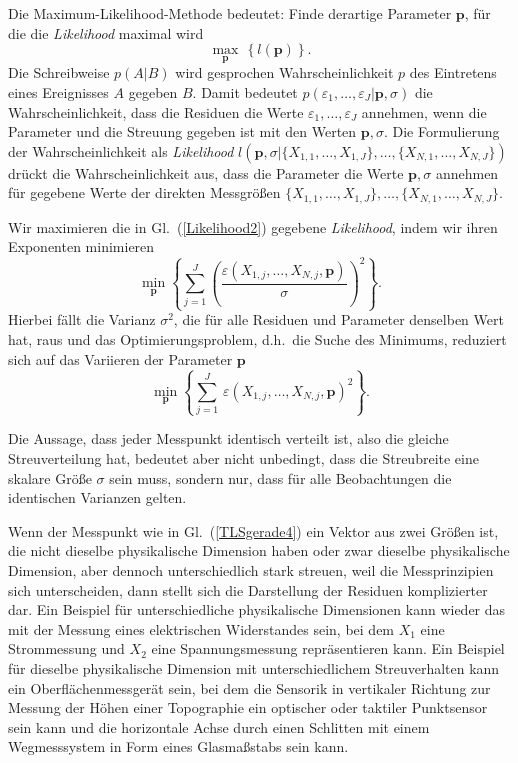 Die Maximum-Likelihood-Methode bedeutet: Finde derartige Parameter $\mathbf{p}$, für die
die \textsl{Likelihood} maximal wird
\begin{equation}
\max_{\mathbf{p}} \, \left\{ l(\mathbf{p}) \right\}.
\end{equation}
Die Schreibweise $p(A | B)$ wird gesprochen \glqq Wahrscheinlichkeit $p$ des Eintretens eines Ereignisses
$A$ gegeben $B$\grqq. Damit bedeutet $p(\varepsilon_1,\dots,\varepsilon_J | \mathbf{p}, \sigma)$ die Wahrscheinlichkeit,
dass die Residuen die Werte $\varepsilon_1,\dots,\varepsilon_J$ annehmen, wenn die Parameter und die Streuung gegeben ist
mit den Werten $\mathbf{p}, \sigma$. Die Formulierung der Wahrscheinlichkeit als \textsl{Likelihood}
$l(\mathbf{p}, \sigma | \{X_{1,1}, \dots, X_{1,J}\}, \dots, \{X_{N,1}, \dots, X_{N,J}\})$ drückt die
Wahrscheinlichkeit aus, dass die Parameter die Werte $\mathbf{p}, \sigma$ annehmen für gegebene Werte der
direkten Messgrößen $\{X_{1,1}, \dots, X_{1,J}\}, \dots, \{X_{N,1}, \dots, X_{N,J}\}$.

Wir maximieren die in Gl.~(\ref{Likelihood2}) gegebene \textsl{Likelihood}, indem wir
ihren Exponenten minimieren
\begin{equation}
\min_{\mathbf{p}}\left\{ \sum\limits_{j = 1}^J \left(\frac{\varepsilon(X_{1,j},\dots,X_{N,j},\mathbf{p})}{\sigma}\right)^2  \right\}.
\end{equation}
Hierbei fällt die Varianz $\sigma^2$, die für alle Residuen und Parameter denselben Wert hat, raus und
das Optimierungsproblem, d.h.\ die Suche des Minimums, reduziert sich
auf das Variieren der Parameter $\mathbf{p}$
\begin{equation}
\min_{\mathbf{p}} \left\{ \sum\limits_{j = 1}^J \, \varepsilon(X_{1,j},\dots,X_{N,j},\mathbf{p})^2  \right\} .
\end{equation}

Die Aussage, dass jeder Messpunkt identisch verteilt ist, also die gleiche Streuverteilung hat,
bedeutet aber nicht unbedingt, dass die Streubreite eine skalare Größe $\sigma$ sein muss,
sondern nur, dass für alle Beobachtungen die identischen Varianzen gelten.

Wenn der Messpunkt wie in Gl.~(\ref{TLSgerade4}) ein Vektor aus zwei Größen ist, die nicht
dieselbe physikalische Dimension haben oder zwar dieselbe physikalische Dimension, aber dennoch
unterschiedlich stark streuen, weil die Messprinzipien sich unterscheiden, dann stellt sich
die Darstellung der Residuen komplizierter dar. Ein Beispiel für unterschiedliche physikalische
Dimensionen kann wieder das mit der Messung eines elektrischen Widerstandes sein, bei dem $X_1$ eine
Strommessung und $X_2$ eine Spannungsmessung repräsentieren kann.
Ein Beispiel für dieselbe physikalische Dimension mit unterschiedlichem Streuverhalten kann ein
Oberflächenmessgerät sein, bei dem die Sensorik in vertikaler Richtung zur Messung der Höhen einer
Topographie ein optischer oder taktiler Punktsensor sein kann und die horizontale Achse durch einen
Schlitten mit einem Wegmesssystem in Form eines Glasmaßstabs sein kann.

